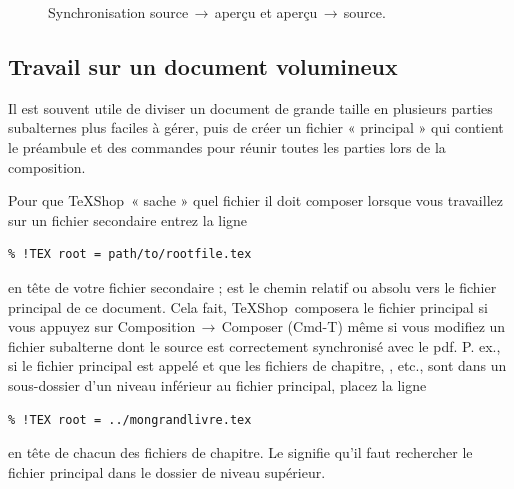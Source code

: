 \documentclass[11pt,french]{article}
\newcommand{\TS}{\textsf{\TeX Shop}}
\newcommand{\acr}[1]{\textsf{#1}}
\newcommand{\cmd}[1]{\textsf{#1}}
\newcommand{\mnu}[1]{\textsf{#1}}
\newcommand{\To}{\,\(\to\)\,}
\begin{document}
\begin{figure}
\centering
{}\qquad{}
\caption{Synchronisation source\To aperçu et aperçu\To source.}
\label{fig:SourcePreviewSync}
\end{figure}



\subsection{Travail sur un document volumineux}

Il est souvent utile de diviser un document de grande taille en plusieurs parties subalternes plus faciles à gérer, puis de créer un fichier « principal » qui contient le préambule et des commandes \verb|| pour réunir toutes les parties lors de la composition.

Pour que \TS\ « sache » quel fichier il doit composer lorsque vous travaillez sur un fichier secondaire entrez la ligne \begin{verbatim}
% !TEX root = path/to/rootfile.tex
\end{verbatim}
en tête de votre fichier secondaire ;  est le chemin relatif ou absolu vers le fichier principal de ce document. Cela fait, \TS\ composera le fichier principal si vous appuyez sur \mnu{Composition}\To\mnu{Composer} (\cmd{Cmd-T}) même si vous modifiez un fichier subalterne dont le source est correctement synchronisé avec le \acr{pdf}. P. ex., si le fichier principal est appelé  et que les fichiers de chapitre, , etc., sont dans un sous-dossier  d'un niveau inférieur au fichier principal, placez la ligne
\begin{verbatim}
% !TEX root = ../mongrandlivre.tex
\end{verbatim}
en tête de chacun des fichiers de chapitre. Le  signifie qu'il faut rechercher le fichier principal dans le dossier de niveau supérieur.
\end{document}
